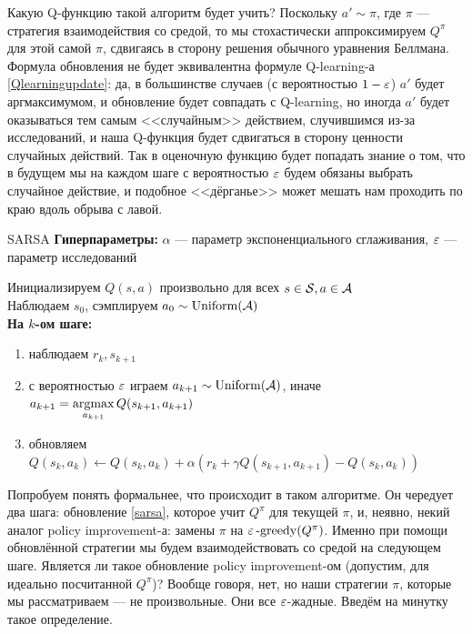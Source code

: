 Какую Q-функцию такой алгоритм будет учить? Поскольку $a' \sim \pi$, где $\pi$ --- стратегия взаимодействия со средой, то мы стохастически аппроксимируем $Q^{\pi}$ для этой самой $\pi$, сдвигаясь в сторону решения обычного уравнения Беллмана. Формула обновления не будет эквивалентна формуле Q-learning-а \eqref{Qlearningupdate}: да, в большинстве случаев (с вероятностью $1 \HM- \eps$) $a'$ будет аргмаксимумом, и обновление будет совпадать с Q-learning, но иногда $a'$ будет оказываться тем самым <<случайным>> действием, случившимся из-за исследований, и наша Q-функция будет сдвигаться в сторону ценности случайных действий. Так в оценочную функцию будет попадать знание о том, что в будущем мы на каждом шаге с вероятностью $\varepsilon$ будем обязаны выбрать случайное действие, и подобное <<дёрганье>> может мешать нам проходить по краю вдоль обрыва с лавой.

\begin{algorithm}{SARSA}
\textbf{Гиперпараметры:} $\alpha$ --- параметр экспоненциального сглаживания, $\varepsilon$ --- параметр исследований

\vspace{0.3cm}
Инициализируем $Q(s, a)$ произвольно для всех $s \in \mathcal{S}, a \in \mathcal{A}$ \\
Наблюдаем $s_0$, сэмплируем $a_0 \sim \operatorname{Uniform}(\mathcal{A})$ \\
\textbf{На $k$-ом шаге:}
\begin{enumerate}
    \item наблюдаем $r_k, s_{k+1}$
    \item с вероятностью $\varepsilon$ играем $a_{k+1} \sim \operatorname{Uniform}(\mathcal{A})$, иначе $a_{k+1} = \mathop{\mathrm{argmax}}\limits_{a_{k+1}} Q(s_{k+1}, a_{k+1})$
    \item обновляем $Q(s_k, a_k) \leftarrow Q(s_k, a_k) + \alpha \left( r_k + \gamma Q(s_{k+1}, a_{k+1}) - Q(s_k, a_k) \right)$
\end{enumerate}
\end{algorithm}

Попробуем понять формальнее, что происходит в таком алгоритме. Он чередует два шага: обновление \eqref{sarsa}, которое учит $Q^{\pi}$ для текущей $\pi$, и, неявно, некий аналог policy improvement-а: замены $\pi$ на $\varepsilon\operatorname{-greedy}(Q^{\pi})$. Именно при помощи обновлённой стратегии мы будем взаимодействовать со средой на следующем шаге. Является ли такое обновление policy improvement-ом (допустим, для идеально посчитанной $Q^\pi$)? Вообще говоря, нет, но наши стратегии $\pi$, которые мы рассматриваем --- не произвольные. Они все $\varepsilon$-жадные. Введём на минутку такое определение.

